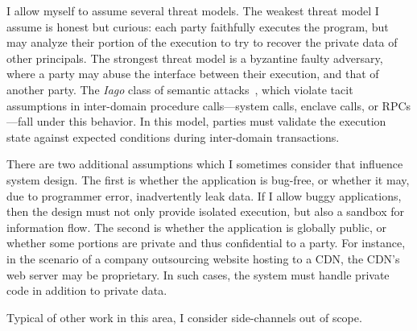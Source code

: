 I allow myself to assume several threat models.
%
The weakest threat model I assume is honest but curious: each party faithfully
executes the program, but may analyze their portion of the execution to try to
recover the private data of other principals.
%
The strongest threat model is a byzantine faulty adversary, where a party may
abuse the interface between their execution, and that of another party.
%
The \emph{Iago} class of semantic attacks~\cite{iago-attacks}, which violate
tacit assumptions in inter-domain procedure calls---system calls, enclave
calls, or RPCs---fall under this behavior.
%
In this model, parties must validate the execution state against expected
conditions during inter-domain transactions.


There are two additional assumptions which I sometimes consider that
influence system design.
%
The first is whether the application is bug-free, or whether it may, due to
programmer error, inadvertently leak data.
%
If I allow buggy applications, then the design must not only provide isolated
execution, but also a sandbox for information flow.
%
The second is whether the application is globally public, or whether some
portions are private and thus confidential to a party. 
%
For instance, in the scenario of a company outsourcing website hosting to a CDN,
the CDN's web server may be proprietary.
%
In such cases, the system must handle private code in addition to private data.


Typical of other work in this area, I consider side-channels out of scope.
